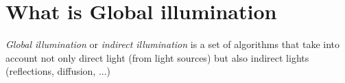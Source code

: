 
\section{What is Global illumination}

\begin{definition}
\label{def:glob_illum}
\textit{Global illumination} or \textit{indirect illumination} is a set of algorithms that take into account not only direct light (from light sources) but also indirect lights (reflections, diffusion, ...) 
\end{definition}